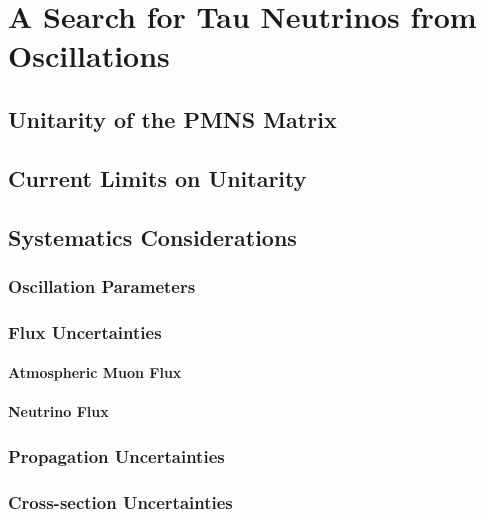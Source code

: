 \chapter{A Search for Tau Neutrinos from Oscillations}

\label{sec:unitarity}
\section{Unitarity of the PMNS Matrix}

\label{sec:current_limits}
\section{Current Limits on Unitarity}

\label{sec:systematics}
\section{Systematics Considerations}

\label{subsec:oscillation_params}
\subsection{Oscillation Parameters}

\label{subsec:flux_systematics}
\subsection{Flux Uncertainties}

\label{subsubsec:muon_systematics}
\subsubsection{Atmospheric Muon Flux}

\label{subsubsec:neutrino_flux}
\subsubsection{Neutrino Flux}

\label{subsec:propagation_systematics}
\subsection{Propagation Uncertainties}

\label{subsec:xsec_systematics}
\subsection{Cross-section Uncertainties}

